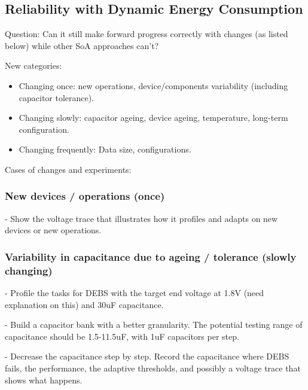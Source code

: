 

% 
% 





\subsection{Reliability with Dynamic Energy Consumption}

Question: Can it still make forward progress correctly with changes (as listed below) while other SoA approaches can't? 


New categories:

\begin{itemize}
    \item Changing once: new operations, device/components variability (including capacitor tolerance).
    \item Changing slowly: capacitor ageing, device ageing, temperature, long-term configuration.
    \item Changing frequently: Data size, configurations. 
\end{itemize}


Cases of changes and experiments:

\subsubsection{New devices / operations (once)}

- Show the voltage trace that illustrates how it profiles and adapts on new devices or new operations. 

\subsubsection{Variability in capacitance due to ageing / tolerance (slowly changing)}

- Profile the tasks for DEBS with the target end voltage at 1.8V (need explanation on this) and 30uF capacitance. 

- Build a capacitor bank with a better granularity. The potential testing range of capacitance should be 1.5-11.5uF, with 1uF capacitors per step. 

- Decrease the capacitance step by step. Record the capacitance where DEBS fails, the performance, the adaptive thresholds, and possibly a voltage trace that shows what happens. 


